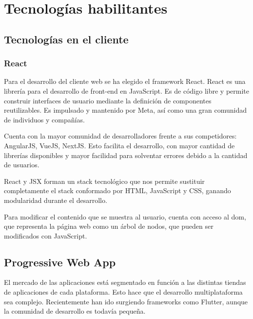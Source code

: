 \chapter{Tecnologías habilitantes}
\label{chap:enabling_technologies}



\section{Tecnologías en el cliente}
\label{tec_hab:client}


\subsection{React}
\label{tec_hab:react}


Para el desarrollo del cliente web se ha elegido el framework React. React es una librería para el desarrollo de front-end en JavaScript. Es de código libre y permite construir interfaces de usuario mediante la definición de componentes reutilizables. Es impulsado y mantenido por Meta, así como una gran comunidad de individuos y compañías.

Cuenta con la mayor comunidad de desarrolladores frente a sus competidores: AngularJS, VueJS, NextJS. Esto facilita el desarrollo, con mayor cantidad de librerías disponibles y mayor facilidad para solventar errores debido a la cantidad de usuarios.

React y JSX forman un stack tecnológico que nos permite sustituir completamente el stack conformado por HTML, JavaScript y CSS, ganando modularidad durante el desarrollo.

Para modificar el contenido que se muestra al usuario, cuenta con acceso al \acrshort{dom}, que representa la página web como un árbol de nodos, que pueden ser modificados con JavaScript.

\section{Progressive Web App}
\label{tec_hab:PWA}

El mercado de las aplicaciones está segmentado en función a las distintas tiendas de aplicaciones de cada plataforma. Esto hace que el desarrollo multiplataforma sea complejo. Recientemente han ido surgiendo frameworks como Flutter, aunque la comunidad de desarrollo es todavía pequeña.

